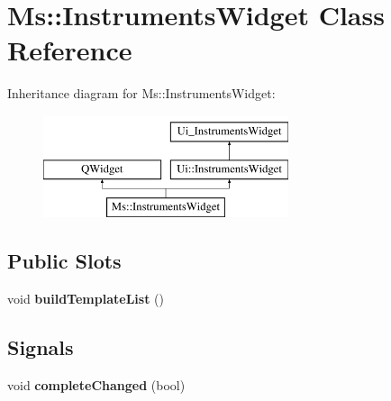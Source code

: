 \hypertarget{class_ms_1_1_instruments_widget}{}\section{Ms\+:\+:Instruments\+Widget Class Reference}
\label{class_ms_1_1_instruments_widget}
Inheritance diagram for Ms\+:\+:Instruments\+Widget\+:\begin{figure}[H]
\begin{center}
\leavevmode
\includegraphics[height=3.000000cm]{class_ms_1_1_instruments_widget}
\end{center}
\end{figure}
\subsection*{Public Slots}
\begin{DoxyCompactItemize}
\item 
\mbox{\label{class_ms_1_1_instruments_widget_a60901a65fea88f2d31693c5b60bedfda}} 
void {\bfseries build\+Template\+List} ()
\end{DoxyCompactItemize}
\subsection*{Signals}
\begin{DoxyCompactItemize}
\item 
\mbox{\label{class_ms_1_1_instruments_widget_af90db2e7a2e170f92e7abe1604542a8a}} 
void {\bfseries complete\+Changed} (bool)
\end{DoxyCompactItemize}
